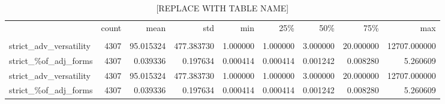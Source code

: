 
\begin{table}[ht]
\caption{[REPLACE WITH TABLE NAME]}
\label{strict-vers-adv}
\begin{tabular}{lrrrrrrrr}
\toprule
 & count & mean & std & min & 25\% & 50\% & 75\% & max \\
 &  &  &  &  &  &  &  &  \\
\midrule
strict\_adv\_versatility & 4307 & 95.015324 & 477.383730 & 1.000000 & 1.000000 & 3.000000 & 20.000000 & 12707.000000 \\
strict\_\%of\_adj\_forms & 4307 & 0.039336 & 0.197634 & 0.000414 & 0.000414 & 0.001242 & 0.008280 & 5.260609 \\
strict\_adv\_versatility & 4307 & 95.015324 & 477.383730 & 1.000000 & 1.000000 & 3.000000 & 20.000000 & 12707.000000 \\
strict\_\%of\_adj\_forms & 4307 & 0.039336 & 0.197634 & 0.000414 & 0.000414 & 0.001242 & 0.008280 & 5.260609 \\
\bottomrule
\end{tabular}
\end{table}
